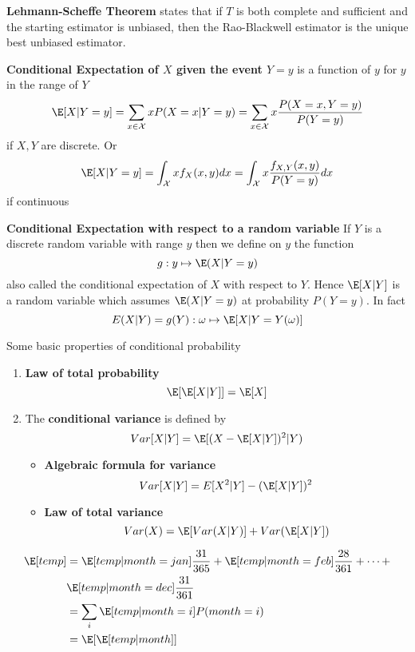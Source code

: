 \documentclass[11pt]{article}
\begin{document}
\begin{theorem*}
    \textbf{Lehmann-Scheffe Theorem} states that if $T$ is both complete and sufficient and the starting estimator is unbiased, then the Rao-Blackwell estimator is the unique best unbiased estimator.
\end{theorem*}

\begin{defn*}
  \item \textbf{Conditional Expectation of $X$ given the event $Y=y$} is a function of $y$ for $y$ in the range of $Y$
  \[
    \E[X|Y=y] = \sum_{x\in\mathcal{X}} xP(X=x | Y=y) =  \sum_{x\in\mathcal{X}} x\frac{P(X=x, Y=y)}{P(Y=y)}
  \]
  if $X,Y$ are discrete. Or
  \[
    \E[X|Y=y] = \int_{\mathcal{X}} xf_X(x,y) dx =  \int_{\mathcal{X}} x \frac{f_{X,Y}(x,y)}{P(Y=y)} dx
  \]
  if continuous
  \item \textbf{Conditional Expectation with respect to a random variable} If $Y$ is a discrete random variable with range $y$ then we define on $y$ the function
  \[
    g: y \mapsto \E(X|Y=y)
  \]
  also called the conditional expectation of $X$ with respect to $Y$. Hence $\E[X|Y]$ is a random variable which assumes $\E(X|Y=y)$ at probability $P(Y=y)$. In fact
  \[
    E(X|Y) = g(Y): \omega \mapsto \E[X|Y = Y(\omega)]
  \]
\end{defn*}

\begin{proposition*}
  Some basic properties of conditional probability
  \begin{enumerate}
    \item \textbf{Law of total probability}
    \[
      \E[\E[X|Y]] = \E[X]
    \]
    \item The \textbf{conditional variance} is defined by
    \[
      Var[X|Y] = \E[(X-\E[X|Y])^2 | Y)
    \]
    \begin{itemize}
      \item \textbf{Algebraic formula for variance}
      \[
        Var[X|Y] = E[X^2 | Y] - (\E[X|Y])^2
      \]
      \item \textbf{Law of total variance}
      \[
        Var(X) = \E[Var(X|Y)] + Var(\E[X|Y])
      \]
    \end{itemize}
  \end{enumerate}
\end{proposition*}



\begin{example}
  \begin{align*}
      \E[temp] &= \E[temp | month=jan] \frac{31}{365} + \E[temp | month=feb] \frac{28}{361} + \cdots + \\
      &\E[temp | month=dec] \frac{31}{361} \\
      &=\sum_{i} \E[temp|month=i] P(month=i)\\
      &=\E[\E[temp|month]]
  \end{align*}
\end{example}
\end{document}
